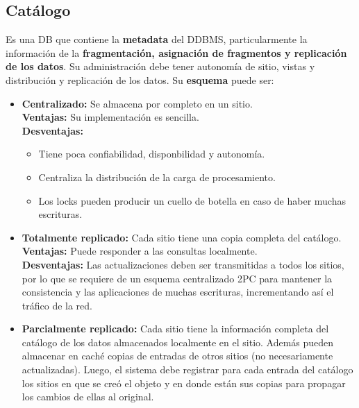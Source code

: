 \subsection*{Catálogo}
Es una DB que contiene la \textbf{metadata} del DDBMS, particularmente la información de la \textbf{fragmentación, asignación de fragmentos y replicación de los datos}. Su administración debe tener autonomía de sitio, vistas y distribución y replicación de los datos. Su \textbf{esquema} puede ser:
\begin{itemize}
    \item \textbf{Centralizado:} Se almacena por completo en un sitio. \\
    \textbf{Ventajas:} Su implementación es sencilla. \\
    \textbf{Desventajas:}
    \begin{itemize}
        \item Tiene poca confiabilidad, disponbilidad y autonomía.
        \item Centraliza la distribución de la carga de procesamiento.
        \item Los locks pueden producir un cuello de botella en caso de haber muchas escrituras.
    \end{itemize}
    \item \textbf{Totalmente replicado:} Cada sitio tiene una copia completa del catálogo. \\
    \textbf{Ventajas:} Puede responder a las consultas localmente. \\
    \textbf{Desventajas:} Las actualizaciones deben ser transmitidas a todos los sitios, por lo que se requiere de un esquema centralizado 2PC para mantener la consistencia y las aplicaciones de muchas escrituras, incrementando así el tráfico de la red.
    \item \textbf{Parcialmente replicado:} Cada sitio tiene la información completa del catálogo de los datos almacenados localmente en el sitio. Además pueden almacenar en caché copias de entradas de otros sitios (no necesariamente actualizadas). Luego, el sistema debe registrar para cada entrada del catálogo los sitios en que se creó el objeto y en donde están sus copias para propagar los cambios de ellas al original.
\end{itemize}

